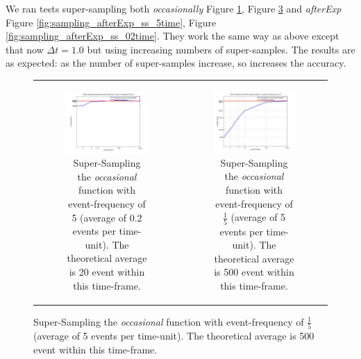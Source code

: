 We ran tests super-sampling both \textit{occasionally} Figure \ref{fig:sampling_occasionally_ss_02evts}, Figure \ref{fig:sampling_occasionally_ss_5evts} and \textit{afterExp} Figure \ref{fig:sampling_afterExp_ss_5time}, Figure \ref{fig:sampling_afterExp_ss_02time}. They work the same way as above except that now $\Delta t = 1.0$ but using increasing numbers of super-samples. The results are as expected: as the number of super-samples increase, so increases the accuracy.

\begin{figure}
\begin{center}
	\begin{tabular}{c c}
		\begin{subfigure}[b]{0.5\textwidth}
			\centering
			\includegraphics[width=.6\textwidth, angle=0]{./../shared/fig/sampling/samplingTest_occasionally_ss_02evts.png}
			\caption{Super-Sampling the \textit{occasional} function with event-frequency of 5 (average of 0.2 events per time-unit). The theoretical average is 20 event within this time-frame.}
			\label{fig:sampling_occasionally_ss_02evts}
		\end{subfigure}
	
		&
		
		\begin{subfigure}[b]{0.5\textwidth}
			\centering
			\includegraphics[width=.6\textwidth, angle=0]{./../shared/fig/sampling/samplingTest_occasionally_ss_5evts.png}
			\caption{Super-Sampling the \textit{occasional} function with event-frequency of $\frac{1}{5}$ (average of 5 events per time-unit). The theoretical average is 500 event within this time-frame.}
			\label{fig:sampling_occasionally_ss_5evts}
		\end{subfigure}


\end{tabular}
\end{center}
\end{figure}
